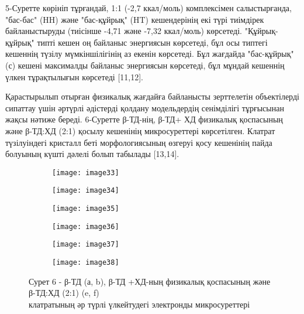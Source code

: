 \begin{multicols}{2}
5-Суретте көрініп тұрғандай, 1:1 (-2,7 ккал/моль) комплексімен
салыстырғанда, "бас-бас" (HH) және "бас-құйрық" (HT) кешендерінің екі
түрі тиімдірек байланыстыруды (тиісінше -4,71 және -7,32 ккал/моль)
көрсетеді. "Құйрық-құйрық" типті кешен оң байланыс энергиясын көрсетеді,
бұл осы типтегі кешеннің түзілу мүмкіншілігінің аз екенін көрсетеді. Бұл
жағдайда "бас-құйрық" (с) кешені максималды байланыс энергиясын
көрсетеді, бұл мұндай кешеннің үлкен тұрақтылығын көрсетеді {[}11,12{]}.

Қарастырылып отырған физикалық жағдайға байланысты зерттелетін
объектілерді сипаттау үшін әртүрлі әдістерді қолдану модельдердің
сенімділігі тұрғысынан жақсы нәтиже береді. 6-Суретте β-ТД-нің, β-ТД+ ХД
физикалық қоспасының және β-ТД:ХД (2:1) қосылу кешенінің микросуреттері
көрсетілген. Клатрат түзілуіндегі кристалл беті морфологиясының өзгеруі
қосу кешенінің пайда болуының күшті дәлелі болып табылады {[}13,14{]}.
\end{multicols}

\begin{figure}[H]
\centering
\begin{subfigure}[b]{0.3\textwidth}
\centering
\texttt{[image: image33]}
\end{subfigure}
\begin{subfigure}[b]{0.3\textwidth}
\centering
\texttt{[image: image34]}
\end{subfigure}
\begin{subfigure}[b]{0.3\textwidth}
\centering
\texttt{[image: image35]}
\end{subfigure}
\begin{subfigure}[b]{0.3\textwidth}
\centering
\texttt{[image: image36]}
\end{subfigure}
\begin{subfigure}[b]{0.3\textwidth}
\centering
\texttt{[image: image37]}
\end{subfigure}
\begin{subfigure}[b]{0.3\textwidth}
\centering
\texttt{[image: image38]}
\end{subfigure}
\caption*{Сурет 6 - β-ТД (а, b), β-ТД +ХД-ның физикалық қоспасының және β-ТД:ХД (2:1) (e, f) \\
клатратының әр түрлі үлкейтудегі электронды микросуреттері}
\end{figure}

